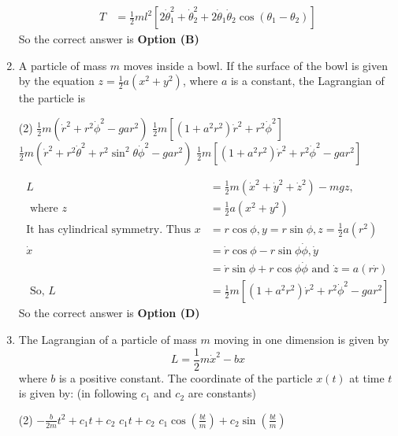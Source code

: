 \begin{enumerate}
\begin{answer}
\begin{align*}
T&=\frac{1}{2} m l^{2}\left[2 \dot{\theta}_{1}^{2}+\dot{\theta}_{2}^{2}+2 \dot{\theta}_{1} \dot{\theta}_{2} \cos \left(\theta_{1}-\theta_{2}\right)\right]
\end{align*}
So the correct answer is \textbf{Option (B)}
\end{answer}
\item A particle of mass $m$ moves inside a bowl. If the surface of the bowl is given by the equation $z=\frac{1}{2} a\left(x^{2}+y^{2}\right)$, where $a$ is a constant, the Lagrangian of the particle is
{}
\begin{tasks}(2)
\task[\textbf{A.}] $\frac{1}{2} m\left(\dot{r}^{2}+r^{2} \dot{\phi}^{2}-g a r^{2}\right)$
\task[\textbf{B.}] $\frac{1}{2} m\left[\left(1+a^{2} r^{2}\right) \dot{r}^{2}+r^{2} \dot{\phi}^{2}\right]$
\task[\textbf{C.}]  $\frac{1}{2} m\left(\dot{r}^{2}+r^{2} \dot{\theta}^{2}+r^{2} \sin ^{2} \theta \dot{\phi}^{2}-g a r^{2}\right)$
\task[\textbf{D.}]  $\frac{1}{2} m\left[\left(1+a^{2} r^{2}\right) \dot{r}^{2}+r^{2} \dot{\phi}^{2}-g a r^{2}\right]$
\end{tasks}
\begin{answer}
\begin{align*}
L&=\frac{1}{2} m\left(\dot{x}^{2}+\dot{y}^{2}+\dot{z}^{2}\right)-m g z,\\\text{ where } z&=\frac{1}{2} a\left(x^{2}+y^{2}\right)\\
\text{It has cylindrical symmetry. Thus }x&=r \cos \phi, y=r \sin \phi, z=\frac{1}{2} a\left(r^{2}\right)\\
\dot{x}&=\dot{r} \cos \phi-r \sin \phi \dot{\phi}, \dot{y}\\&=\dot{r} \sin \phi+r \cos \phi \dot{\phi}\text{ and }\dot{z}=a(r \dot{r})\\
\text{	So, }L&=\frac{1}{2} m\left[\left(1+a^{2} r^{2}\right) \dot{r}^{2}+r^{2} \dot{\phi}^{2}-g a r^{2}\right]
\end{align*}
So the correct answer is \textbf{Option (D)}
\end{answer}
\item The Lagrangian of a particle of mass $m$ moving in one dimension is given by
$$
L=\frac{1}{2} m \dot{x}^{2}-b x
$$
where $b$ is a positive constant. The coordinate of the particle $x(t)$ at time $t$ is given by: (in following $c_{1}$ and $c_{2}$ are constants)
{}
\begin{tasks}(2)
\task[\textbf{A.}] $-\frac{b}{2 m} t^{2}+c_{1} t+c_{2}$
\task[\textbf{B.}] $c_{1} t+c_{2}$
\task[\textbf{C.}] $c_{1} \cos \left(\frac{b t}{m}\right)+c_{2} \sin \left(\frac{b t}{m}\right)$

\end{tasks}
\end{enumerate}
